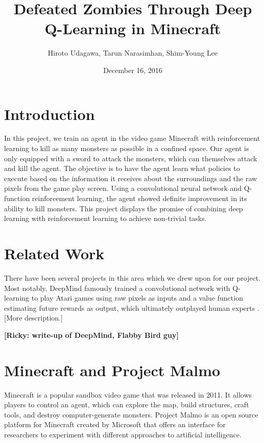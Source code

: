 \documentclass{article}
\title{Defeated Zombies Through Deep Q-Learning in Minecraft}
\author{Hiroto Udagawa, Tarun Narasimhan, Shim-Young Lee}
\date{December 16, 2016}
\begin{document}
\maketitle

\begin{multicols}{2}

\section{Introduction}

In this project, we train an agent in the video game Minecraft with reinforcement learning to kill as many monsters as possible in a confined space. Our agent is only equipped with a sword to attack the monsters,  which can themselves attack and kill the agent. The objective is to have the agent learn what policies to execute based on the information it receives about the surroundings and the raw pixels from the game play screen. Using a convolutional neural network and Q-function reinforcement learning, the agent showed definite improvement in its ability to kill monsters. This project displays the promise of combining deep learning with reinforcement learning to achieve non-trivial tasks.

\section{Related Work}

There have been several projects in this area which we drew upon for our project. Most notably, DeepMind famously trained a convolutional network with Q-learning to play Atari games using raw pixels as inputs and a value function estimating future rewards as output, which ultimately outplayed human experts \cite{deepMind}. [More description.]


\bf [Ricky: write-up of DeepMind, Flabby Bird guy] \rm

\section{Minecraft and Project Malmo}

Minecraft is a popular sandbox video game that was released in 2011. It allows players to control an agent, which can explore the map, build structures, craft tools, and destroy computer-generate monsters. Project Malmo is an open source platform for Minecraft created by Microsoft that offers an interface for researchers to experiment with different approaches to artificial intelligence.


\end{multicols}
\end{document}
